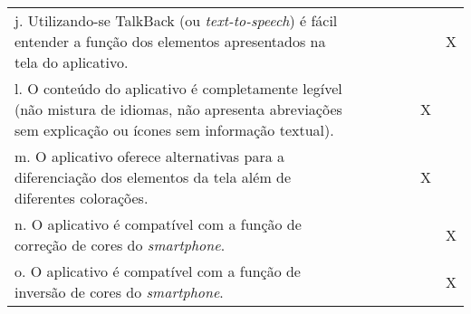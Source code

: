 \documentclass[portuguese,oneside]{tcc}
\begin{document}
\begin{center}
\begin{longtabu}{|L{25em}|c|c|c|c|c|c|}
																											j. Utilizando-se TalkBack (ou \emph{text-to-speech}) é fácil entender a função dos elementos apresentados na tela do aplicativo. & & & & & & X \\ 
																											l. O conteúdo do aplicativo é completamente legível (não mistura de idiomas, não apresenta abreviações sem explicação ou ícones sem informação textual). & & & & & X & \\ 
																											m. O aplicativo oferece alternativas para a diferenciação dos elementos da tela além de diferentes colorações. & & & & & X & \\ 
																											n. O aplicativo é compatível com a função de correção de cores do \emph{smartphone}. & & & & & & X \\ 
																											o. O aplicativo é compatível com a função de inversão de cores do \emph{smartphone}. & & & & & & X \\ 
																										\end{longtabu}
																									\end{center}
																									
\end{document}
